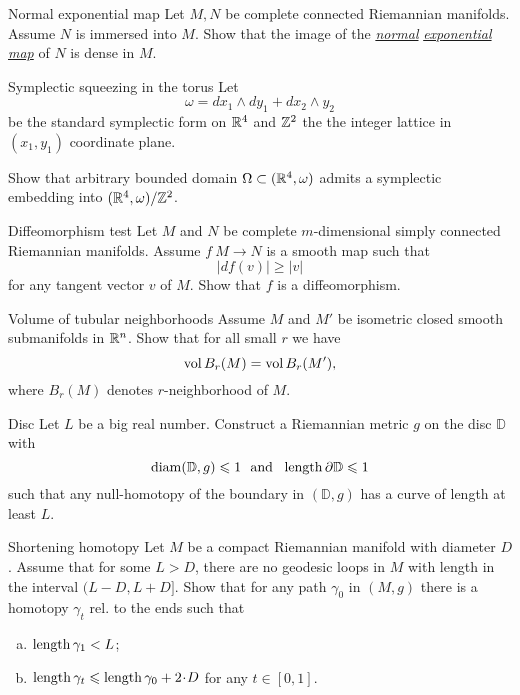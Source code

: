 \documentclass[twoside]{book}
\begin{document}
\begin{pr}{\easy}{Normal exponential map}\label{Normal exponential map}
Let $M,N$ be complete connected Riemannian manifolds.
Assume $N$ is immersed into $M$.
Show that the image  of the 
\hyperref[Exponential map]{\emph{normal}} 
\hyperref[Exponential map]{\emph{exponential}} 
\hyperref[Exponential map]{\emph{map}} of $N$ is dense in $M$.
\end{pr}

\begin{pr}{}{Symplectic squeezing in the torus}\label{Symplectic squeezing in the torus}
Let 
\[\omega=dx_1\wedge dy_1+ dx_2\wedge y_2\]
be the standard symplectic form on $\mathbb{R}^4$
and $\mathbb{Z}^2$ the the integer lattice in $(x_1,y_1)$ coordinate plane.

Show that arbitrary bounded domain $\Omega\subset (\mathbb{R}^4,\omega)$
admits a symplectic embedding into $(\mathbb{R}^4,\omega)/\mathbb{Z}^2$. 
\end{pr}


\begin{pr}{\easy}{Diffeomorphism test}\label{Diffeomorphism test}
Let $M$ and $N$ be 
complete 
$m$-dimensional
simply connected 
Riemannian manifolds.
Assume $f\:M\to N$
is a smooth map such that 
$$|df(v)|\ge |v|$$
for any tangent vector $v$ of $M$.
Show that $f$ is a diffeomorphism.
\end{pr}

\begin{pr}{}{Volume of tubular neighborhoods}\label{Volume of tubular neighborhoods}
Assume $M$ and $M'$ be isometric closed smooth submanifolds in $\mathbb{R}^n$.
Show that for all small $r$ we have
$$\operatorname{\rm vol} B_r(M)=\operatorname{\rm vol} B_r(M'),$$
where $B_r(M)$ denotes $r$-neighborhood of $M$.
\end{pr}

\begin{pr}{\hard}{Disc}\label{Disc}
Let $L$ be a big real number.
Construct a Riemannian metric $g$ on the disc $\mathbb D$ 
with 
\[\diam(\mathbb D,g)\le 1
\ \ 
\text{and}
\ \ 
\length \partial\mathbb D\le 1  \]
such that any null-homotopy of the boundary in $(\mathbb D,g)$ 
has a curve of length at least $L$.
\end{pr}

\begin{pr}{\thm}{Shortening homotopy}\label{short-homotopy}
Let $M$ be a compact Riemannian manifold with diameter $D$.
Assume that for some $L>D$,
there are no geodesic loops in $M$
with length in the interval $(L-D,L+ D]$.
Show that for any path $\gamma_0$ in $(M,g)$
there is a homotopy $\gamma_t$ rel. to the ends
such that 
\begin{enumerate}[a)]
\item $\operatorname{\rm length} \gamma_1<L$;
\item $\length \gamma_t\le \length \gamma_0+2\cdot D$ for any $t\in[0,1]$.
 
\end{enumerate}
\end{pr}
\end{document}
